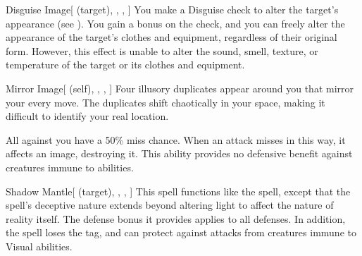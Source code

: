 \lowercase{\hypertarget{spell:Disguise Image}{}}\label{spell:Disguise Image}
\begin{attuneability}[\nth{2}]{\hypertarget{spell:Disguise Image}{Disguise Image}}[ (target), , , ]
You make a Disguise check to alter the target's appearance (see ).
You gain a  bonus on the check, and you can freely alter the appearance of the target's clothes and equipment, regardless of their original form.
However, this effect is unable to alter the sound, smell, texture, or temperature of the target or its clothes and equipment.
\end{attuneability}
\vspace{0.25em}



\lowercase{\hypertarget{spell:Mirror Image}{}}\label{spell:Mirror Image}
\begin{attuneability}[\nth{2}]{\hypertarget{spell:Mirror Image}{Mirror Image}}[ (self), , , ]
Four illusory duplicates appear around you that mirror your every move.
The duplicates shift chaotically in your space, making it difficult to identify your real location.

All   against you have a 50\% miss chance.
When an attack misses in this way, it affects an image, destroying it.
This ability provides no defensive benefit against creatures immune to  abilities.
\end{attuneability}
\vspace{0.25em}



\lowercase{\hypertarget{spell:Shadow Mantle}{}}\label{spell:Shadow Mantle}
\begin{attuneability}[\nth{3}]{\hypertarget{spell:Shadow Mantle}{Shadow Mantle}}[ (target), , , ]
This spell functions like the  spell, except that the spell's deceptive nature extends beyond altering light to affect the nature of reality itself.
The defense bonus it provides applies to all defenses.
In addition, the spell loses the  tag, and can protect against attacks from creatures immune to Visual abilities.
\end{attuneability}
\vspace{0.25em}



